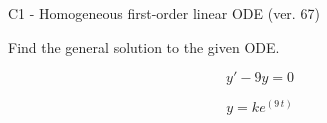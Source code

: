 \begin{exercise}
  \begin{exerciseTitle}C1 - Homogeneous first-order linear ODE (ver. 67)\end{exerciseTitle}
  \begin{exerciseStatement}
    
Find the general solution to the given ODE.

    
\[y'-9y=0\]

  \end{exerciseStatement}
  \begin{exerciseAnswer}
    
\[y= k e^{\left(9 \, t\right)}\]

  \end{exerciseAnswer}
\end{exercise}